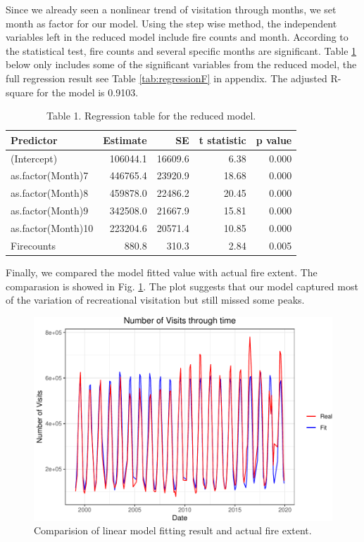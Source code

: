 \documentclass[
  12pt,
]{article}
\begin{document}
Since we already seen a nonlinear trend of visitation through months, we set month as factor for our model. Using the step wise method, the independent variables left in the reduced model include fire counts and month. According to the statistical test, fire counts and several specific months are significant.
Table \ref{tab:regression} below only includes some of the significant variables from the reduced model, the full regression result see Table \ref{tab:regressionF} in appendix. The adjusted R-square for the model is 0.9103.

\begin{table}

\caption{\label{tab:regression}Table 1. Regression table for the reduced model. }
\centering
\begin{tabular}[t]{l|r|r|r|r}
\hline
Predictor & Estimate & SE & t statistic & p value\\
\hline
(Intercept) & 106044.1 & 16609.6 & 6.38 & 0.000\\
\hline
as.factor(Month)7 & 446765.4 & 23920.9 & 18.68 & 0.000\\
\hline
as.factor(Month)8 & 459878.0 & 22486.2 & 20.45 & 0.000\\
\hline
as.factor(Month)9 & 342508.0 & 21667.9 & 15.81 & 0.000\\
\hline
as.factor(Month)10 & 223204.6 & 20571.4 & 10.85 & 0.000\\
\hline
Firecounts & 880.8 & 310.3 & 2.84 & 0.005\\
\hline
\end{tabular}
\end{table}

Finally, we compared the model fitted value with actual fire extent. The comparasion is showed in Fig. \ref{fig:fitplot}. The plot suggests that our model captured most of the variation of recreational visitation but still missed some peaks.

\begin{figure}
\centering
\includegraphics{CodeFinal_files/figure-latex/fitplot-1.pdf}
\caption{\label{fig:fitplot}Comparision of linear model fitting result and actual fire extent.}
\end{figure}
\end{document}
